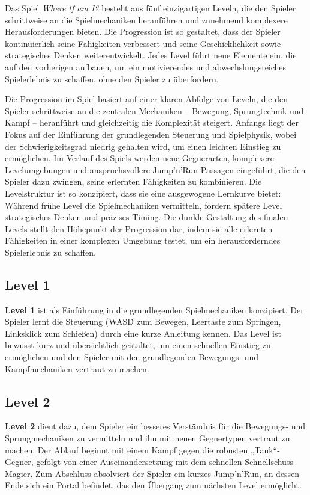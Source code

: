 \documentclass[oneside]{ausarbeitung}
\begin{document}
Das Spiel \textit{Where tf am I?} besteht aus fünf einzigartigen Leveln, die den Spieler schrittweise an die Spielmechaniken heranführen und zunehmend komplexere Herausforderungen bieten. Die Progression ist so gestaltet, dass der Spieler kontinuierlich seine Fähigkeiten verbessert und seine Geschicklichkeit sowie strategisches Denken weiterentwickelt. Jedes Level führt neue Elemente ein, die auf den vorherigen aufbauen, um ein motivierendes und abwechslungsreiches Spielerlebnis zu schaffen, ohne den Spieler zu überfordern.

Die Progression im Spiel basiert auf einer klaren Abfolge von Leveln, die den Spieler schrittweise an die zentralen Mechaniken – Bewegung, Sprungtechnik und Kampf – heranführt und gleichzeitig die Komplexität steigert. Anfangs liegt der Fokus auf der Einführung der grundlegenden Steuerung und Spielphysik, wobei der Schwierigkeitsgrad niedrig gehalten wird, um einen leichten Einstieg zu ermöglichen. Im Verlauf des Spiels werden neue Gegnerarten, komplexere Levelumgebungen und anspruchsvollere Jump’n’Run-Passagen eingeführt, die den Spieler dazu zwingen, seine erlernten Fähigkeiten zu kombinieren. Die Levelstruktur ist so konzipiert, dass sie eine ausgewogene Lernkurve bietet: Während frühe Level die Spielmechaniken vermitteln, fordern spätere Level strategisches Denken und präzises Timing. Die dunkle Gestaltung des finalen Levels stellt den Höhepunkt der Progression dar, indem sie alle erlernten Fähigkeiten in einer komplexen Umgebung testet, um ein herausforderndes Spielerlebnis zu schaffen.

\subsection{Level 1}
\label{sub:level1}

\textbf{Level 1} ist als Einführung in die grundlegenden Spielmechaniken konzipiert. Der Spieler lernt die Steuerung (WASD zum Bewegen, Leertaste zum Springen, Linksklick zum Schießen) durch eine kurze Anleitung kennen. Das Level ist bewusst kurz und übersichtlich gestaltet, um einen schnellen Einstieg zu ermöglichen und den Spieler mit den grundlegenden Bewegungs- und Kampfmechaniken vertraut zu machen.


\subsection{Level 2}
\label{sub:level2}


\textbf{Level 2} dient dazu, dem Spieler ein besseres Verständnis für die Bewegungs- und Sprungmechaniken zu vermitteln und ihn mit neuen Gegnertypen vertraut zu machen.
Der Ablauf beginnt mit einem Kampf gegen die robusten „Tank“-Gegner, gefolgt von einer Auseinandersetzung mit dem schnellen Schnellschuss-Magier.
Zum Abschluss absolviert der Spieler ein kurzes Jump’n’Run, an dessen Ende sich ein Portal befindet, das den Übergang zum nächsten Level ermöglicht.
\end{document}
